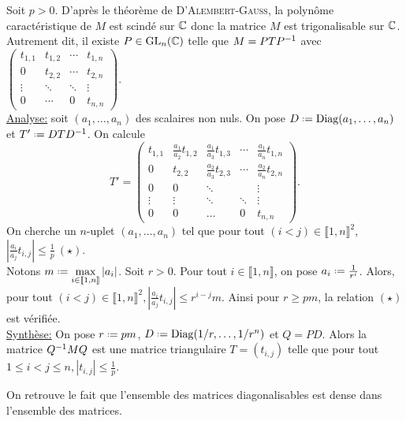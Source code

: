 \begin{solution}
    Soit $p > 0$. D'après le théorème de \textsc{D'Alembert}-\textsc{Gauss}, la polynôme caractéristique de $M$ est scindé sur $\mathbb{C}$ donc la matrice $M$ est trigonalisable sur $\mathbb{C}$. Autrement dit, il existe $P \in \mathrm{GL}_n(\mathbb{C})$ telle que $M = P T P^{-1}$ avec 
    $\begin{pmatrix}
        t_{1,1} & t_{1,2} & \cdots & t_{1,n} \\
        0 & t_{2,2} & \cdots & t_{2,n} \\
        \vdots & \ddots & \ddots & \vdots \\
        0 & \cdots & 0 & t_{n,n}
    \end{pmatrix}. $ \\
    \underline{Analyse:} soit $(a_1, \dots, a_n)$ des scalaires non nuls. On pose $D \defeq \Diag(a_1, \dots, a_n)$ et $T' \defeq D T \Inv{D}$. On calcule
    $$T'=
    \begin{pmatrix}
        t_{1,1} & \frac{a_1}{a_2}t_{1,2} & \frac{a_1}{a_3} t_{1,3} & \cdots & \frac{a_1}{a_n} t_{1,n} \\
        0 & t_{2,2} & \frac{a_2}{a_3}t_{2,3} & \cdots & \frac{a_2}{a_n} t_{2,n} \\
        0 & 0 & \ddots & & \vdots \\
        \vdots & \vdots & \ddots & \ddots & \vdots \\
        0 & 0 & \dots & 0 & t_{n,n}
    \end{pmatrix}.
    $$
    On cherche un $n$-uplet $(a_1, \dots, a_n)$ tel que pour tout $(i < j) \in \llbracket 1, n \rrbracket^2$, $\left| \frac{a_i}{a_j}t_{i,j} \right| \leqslant \frac{1}{p} \ (\star)$. \\
    Notons $m \defeq \max\limits_{i \in \llbracket 1, n \rrbracket} |a_i|$.
    Soit $r > 0$. Pour tout $i \in \llbracket 1, n \rrbracket$, on pose $a_i \defeq \frac{1}{r^i}$. Alors, pour tout $(i < j) \in \llbracket 1, n \rrbracket^2, \left| \frac{a_i}{a_j} t_{i,j} \right| \leqslant r^{i-j}m$. Ainsi pour $r \geqslant pm$, la relation $(\star)$ est vérifiée. \\
    \underline{Synthèse:} On pose $r \defeq pm$, $D \defeq \Diag(1/r, \dots, 1/r^n)$ et $Q = PD$. Alors la matrice $Q^{-1} M Q$ est une matrice triangulaire $T = (t_{i,j})$ telle que pour tout $1 \leqslant i < j \leqslant n, |t_{i,j}| \leqslant \frac{1}{p}$.
\end{solution}

\begin{remarque}
    On retrouve le fait que l'ensemble des matrices diagonalisables est dense dans l'ensemble des matrices.
\end{remarque}


